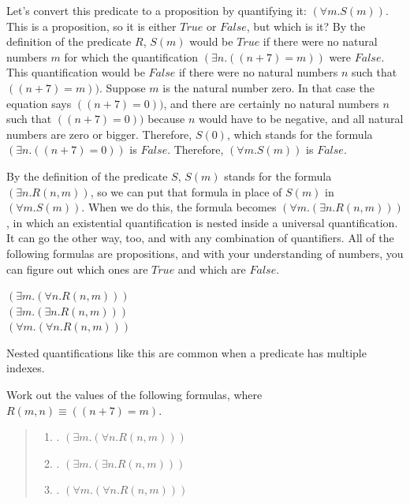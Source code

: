{Let's convert this predicate to a proposition by quantifying it:
$(\forall m.S(m))$. This is a proposition, so
it is either $True$ or $False$, but which is it?
By the definition of the predicate $R$,
$S(m)$ would be $True$ if there were no natural numbers $m$
for which the quantification $(\exists n.((n+7) = m))$ were $False$.
This quantification would be $False$
if there were no natural numbers $n$ such that $((n+7) = m))$.
Suppose $m$ is the natural number zero.
In that case the equation says $((n+7) = 0))$,
and there are certainly no natural numbers $n$ such that
$((n+7) = 0))$ because $n$ would have to be negative,
and all natural numbers are zero or bigger.
Therefore, $S(0)$, which stands for the formula
$(\exists n.((n+7) = 0))$ is $False$.
Therefore, $(\forall m.S(m))$ is $False$.

By the definition of the predicate $S$,
$S(m)$ stands for the formula $(\exists n.R(n,m))$,
so we can put that formula in place of $S(m)$
in $(\forall m.S(m))$. When we do this,
the formula becomes $(\forall m.(\exists n.R(n,m)))$,
in which an existential quantification
is nested inside a universal quantification.
It can go the other way, too, and with any
combination of quantifiers.
All of the following formulas are propositions,
and with your understanding of numbers, you
can figure out which ones are $True$ and
which are $False$.
\begin{center}
$(\exists m.(\forall n.R(n,m)))$ \\
$(\exists m.(\exists n.R(n,m)))$ \\
$(\forall m.(\forall n.R(n,m)))$
\end{center}
Nested quantifications like this are common
when a predicate has multiple indexes.

\begin{ExerciseList}
\Exercise Work out the values of the following formulas,
where $R(m, n) \equiv ((n + 7) = m)$.
\begin{quote}
\begin{enumerate}[label=\alph*]
\item. $(\exists m.(\forall n.R(n,m)))$
\item. $(\exists m.(\exists n.R(n,m)))$
\item. $(\forall m.(\forall n.R(n,m)))$
\end{enumerate}
\end{quote}


\end{ExerciseList}}
